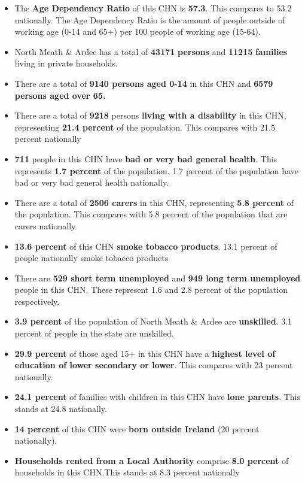 \documentclass{article}
\begin{document}
\begin{itemize}

\item The \textbf{Age Dependency Ratio} of this CHN is  \textbf{57.3}. This compares to 53.2 nationally. The Age Dependency Ratio is the amount of people outside of working age (0-14 and 65+) per 100 people of working age (15-64). 

\item North Meath & Ardee has a total of \textbf{\num{43171}} \textbf{persons} and  \textbf{\num{11215}} \textbf{families} living in private households.

\item There are a total of \textbf{\num{9140} persons aged 0-14} in this CHN and \textbf{\num{6579} persons aged over 65.} 

\item There are a total of \textbf{\num{9218}} persons \textbf{living with a disability} in this CHN, representing \textbf{21.4 percent} of the population. This compares with  21.5 percent nationally

\item \textbf{\num{711}} people in this CHN have \textbf{bad or very bad general health}. This represents \textbf{1.7 percent} of the population. 1.7 percent of the population have bad or very bad general health nationally. 

\item There are a total of \textbf{\num{2506} carers} in this CHN, representing \textbf{5.8 percent} of the population. This compares with 5.8 percent of the population that are carers nationally. 

\item \textbf{13.6 percent} of this CHN \textbf{smoke tobacco products}. 13.1 percent of people nationally smoke tobacco products

\item There are \textbf{\num{529} short term unemployed} and \textbf{\num{949} long term unemployed} people in this CHN. These represent 1.6 and 2.8 percent of the population respectively.

\item  \textbf{3.9 percent} of the population of North Meath & Ardee are \textbf{unskilled}. 3.1 percent of people in the state are unskilled.

\item \textbf{29.9 percent} of those aged 15+ in this CHN have a \textbf{highest level of education of lower secondary or lower}. This compares with 23 percent nationally. 

\item \textbf{24.1 percent} of families with children in this CHN have \textbf{lone parents}. This stands at 24.8 nationally.

\item \textbf{14 percent} of this CHN were \textbf{born outside Ireland} (20 percent nationally).

\item \textbf{Households rented from a Local Authority} comprise \textbf{8.0 percent} of households in this CHN.This stands at 8.3 percent nationally

\end{itemize}
\end{document}
